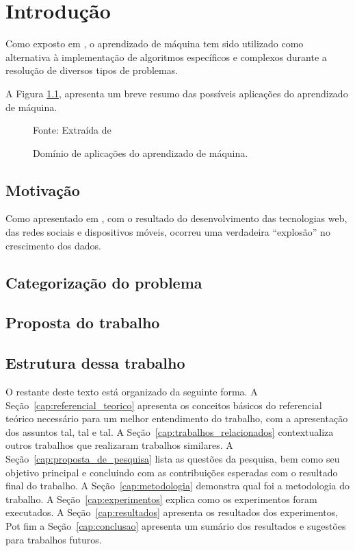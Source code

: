 \chapter{Introdução}

Como exposto em \cite{Torralba2008}, o aprendizado de máquina tem sido utilizado como alternativa à implementação de algoritmos específicos e complexos durante a resolução de diversos tipos de problemas. 

\lipsum[6]

A Figura \ref{fig:mlapplications}, apresenta um breve resumo das possíveis aplicações do aprendizado de máquina.

\begin{figure}[ht]
    \centering
    \caption{Domínio de aplicações do aprendizado de máquina.}
            {Fonte: Extraída de \cite{ApplicationMachineLearning}}
    \label{fig:mlapplications}
\end{figure}

\lipsum[7-8]

\section{Motivação}

Como apresentado em \cite{mohri2018foundations}, com o resultado do desenvolvimento das tecnologias web, das redes sociais e dispositivos móveis, ocorreu uma verdadeira ``explosão'' no crescimento dos dados. 

\lipsum[9-16]


\section{Categorização do problema}

\lipsum[17-18]

\section{Proposta do trabalho}

\lipsum[19-21]

\section{Estrutura dessa trabalho}

O restante deste texto está organizado da seguinte forma. A Seção~\ref{cap:referencial_teorico} apresenta os conceitos básicos do referencial teórico necessário para um melhor entendimento do trabalho, com a apresentação dos assuntos tal, tal e tal. A Seção~\ref{cap:trabalhos_relacionados} contextualiza outros trabalhos que realizaram trabalhos similares. A Seção~\ref{cap:proposta_de_pesquisa} lista as questões da pesquisa, bem como seu objetivo principal e concluindo com as contribuições esperadas com o resultado final do trabalho. A Seção~\ref{cap:metodologia} demonstra qual foi a metodologia do trabalho. A Seção~\ref{cap:experimentos} explica como os experimentos foram executados. A Seção~\ref{cap:resultados} apresenta os resultados dos experimentos, Pot fim a Seção~\ref{cap:conclusao} apresenta um sumário dos resultados e sugestões para trabalhos futuros. 
